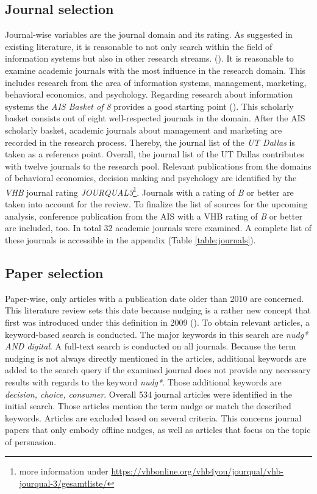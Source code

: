 \subsection{Journal selection}
Journal-wise variables are the journal domain and its rating. As suggested in existing literature, it is reasonable to not only search within the field of information systems but also in other research streams. (\cite{webster_analyzing_2002}). It is reasonable to examine academic journals with the most influence in the research domain. This includes research from the area of information systems, management, marketing, behavioral economics, and psychology. Regarding research about information systems the \textit{AIS Basket of 8} provides a good starting point (\cite{alavi_review_1992}). This scholarly basket consists out of eight well-respected journals in the domain. After the AIS scholarly basket, academic journals about management and marketing are recorded in the research process. Thereby, the journal list of the \textit{UT Dallas} is taken as a reference point. Overall, the journal list of the UT Dallas contributes with twelve journals to the research pool. 
Relevant publications from the domains of behavioral economics, decision making and psychology are identified by the \textit{VHB} journal rating \textit{JOURQUAL3}\footnote{more information under \url{https://vhbonline.org/vhb4you/jourqual/vhb-jourqual-3/gesamtliste/}}. Journals with a rating of \textit{B} or better are taken into account for the review.
To finalize the list of sources for the upcoming analysis, conference publication from the AIS with a VHB rating of \textit{B} or better are included, too. In total 32 academic journals were examined. A complete list of these journals is accessible in the appendix (Table \ref{table:journals}).

\subsection{Paper selection}
Paper-wise, only articles with a publication date older than 2010 are concerned. This literature review sets this date because nudging is a rather new concept that first was introduced under this definition in 2009 (\cite{thaler_nudge:_2009}). To obtain relevant articles, a keyword-based search is conducted. The major keywords in this search are \textit{nudg* AND digital}. A full-text search is conducted on all journals. Because the term nudging is not always directly mentioned in the articles, additional keywords are added to the search query if the examined journal does not provide any necessary results with regards to the keyword \textit{nudg*}. Those additional keywords are \textit{decision, choice, consumer}. Overall 534 journal articles were identified in the initial search. Those articles mention the term nudge or match the described keywords. Articles are excluded based on several criteria. This concerns journal papers that only embody offline nudges, as well as articles that focus on the topic of persuasion. 
\\

